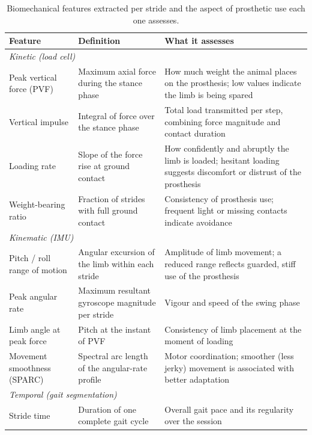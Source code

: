 \begin{table}[ht]
  \centering
  \caption{Biomechanical features extracted per stride and the aspect of
           prosthetic use each one assesses.}
  \label{tab:features}
  \small
  \begin{tabular}{p{3.1cm} p{4.0cm} p{5.0cm}}
    \toprule
    \textbf{Feature} & \textbf{Definition} & \textbf{What it assesses} \\
    \midrule
    \multicolumn{3}{l}{\textit{Kinetic (load cell)}} \\
    \midrule
    Peak vertical force (PVF)
      & Maximum axial force during the stance phase
      & How much weight the animal places on the prosthesis; low values
        indicate the limb is being spared \\
    Vertical impulse
      & Integral of force over the stance phase
      & Total load transmitted per step, combining force magnitude and
        contact duration \\
    Loading rate
      & Slope of the force rise at ground contact
      & How confidently and abruptly the limb is loaded; hesitant loading
        suggests discomfort or distrust of the prosthesis \\
    Weight-bearing ratio
      & Fraction of strides with full ground contact
      & Consistency of prosthesis use; frequent light or missing contacts
        indicate avoidance \\
    \midrule
    \multicolumn{3}{l}{\textit{Kinematic (IMU)}} \\
    \midrule
    Pitch / roll range of motion
      & Angular excursion of the limb within each stride
      & Amplitude of limb movement; a reduced range reflects guarded, stiff
        use of the prosthesis \\
    Peak angular rate
      & Maximum resultant gyroscope magnitude per stride
      & Vigour and speed of the swing phase \\
    Limb angle at peak force
      & Pitch at the instant of PVF
      & Consistency of limb placement at the moment of loading \\
    Movement smoothness (SPARC)
      & Spectral arc length of the angular-rate profile
      & Motor coordination; smoother (less jerky) movement is associated with
        better adaptation \\
    \midrule
    \multicolumn{3}{l}{\textit{Temporal (gait segmentation)}} \\
    \midrule
    Stride time
      & Duration of one complete gait cycle
      & Overall gait pace and its regularity over the session \\

\end{tabular}
\end{table}
